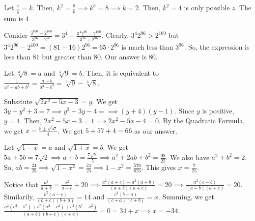 \documentclass[11pt]{article}
\begin{document}

\sol Let $\frac{x}{y}=k$. Then, $k^2=\frac{8}{k}\implies k^3 = 8\implies k =2$. Then, $k^2=4$ is only possible $z$. The sum is $\boxed{4}$ 


\sol Conider $\frac{3^{100}+2^{100}}{3^{96}+2^{96}}=3^4-\frac{3^{4}2^{96}-2^{100}}{3^{96}+2^{96}}$. Clearly, $3^{4}2^{96}>2^{100}$ but $3^{4}2^{96}-2^{100}=(81-16)2^{96}=65\cdot 2^{96}$ is much less than $3^{96}$. So, the expression is less than $81$ but greater than $80$. Our answer is $\boxed{80}$.


\sol Let $\sqrt[3]{8}=a$ and $\sqrt[3]{9}=b$. Then, it is equivalent to $\frac{1}{a^2+ab+b^2}=\frac{a-b}{a^3-b^3}=\boxed{\sqrt[3]{9}-\sqrt[3]{8}}$.


\sol Subsitute $\sqrt{2x^2-5x-3}=y$. We get $3y+y^2+3=7\implies y^2+3y-4=\implies (y+4)(y-1)$. Since $y$ is positive, $y=1$. Then, $2x^2-5x-3=1\implies 2x^2-5x-4=0$. By the Quadratic Formula, we get $x=\frac{5 \pm \sqrt{57}}{4}$. We get $5+57+4=\boxed{66}$ as our answer.


\sol Let $\sqrt{1-x}=a$ and $\sqrt{1+x}=b$. We get $5a+5b=7\sqrt{2}\implies a+b=\frac{7\sqrt{2}}{5}\implies a^2+2ab+b^2 = \frac{98}{25}$. We also have $a^2+b^2=2$. So, $ab=\frac{24}{25}\implies \sqrt{1-x^2}=\frac{24}{25}\implies 1-x^2=\frac{576}{625}$. This gives $x=\boxed{\frac{7}{25}}$.


\sol Notice that $\frac{a^2}{a+b}=\frac{a^2}{a+c}+20\implies \frac{a^2(a+c)-a^2(a+b)}{(a+b)(a+c)}=20\implies \frac{a^2(c-b)}{(a+b)(a+c)}=20$. Similarily, $\frac{b^2(a-c)}{(b+c)(b+a)}=14$ and $\frac{c^2(b-a)}{(c+a)(c+b)}=x$. Summing, we get $\frac{a^{2}(c^2-b^2)+b^{2}(a^2-c^2)+c^2(b^2-a^2)}{(a+b)(b+c)(c+a)}=0=34+x\implies x = \boxed{-34}$.
\end{document}
